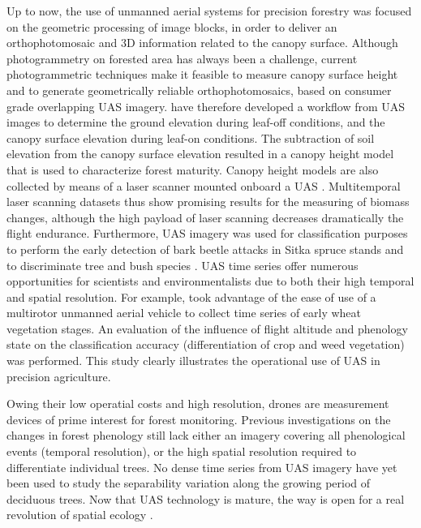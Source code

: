 \documentclass[remotesensing,article,submit,moreauthors,pdftex,12pt,a4paper]{mdpi} %
\begin{document}
Up to now, the use of unmanned aerial systems for precision forestry was focused on the geometric processing of image blocks, in order to deliver an orthophotomosaic and 3D information related to the canopy surface. 
Although photogrammetry on forested area has always been a challenge, current photogrammetric techniques make it feasible to measure canopy surface height and to generate geometrically reliable orthophotomosaics, based on consumer grade overlapping UAS imagery. 
\citeauthor{dandois_high_2013} \cite{dandois_high_2013} have therefore developed a workflow from UAS images to determine the ground elevation during leaf-off conditions, and the canopy surface elevation during leaf-on conditions. 
The subtraction of soil elevation from the canopy surface elevation resulted in a canopy height model that is used to characterize forest maturity. 
Canopy height models are also collected by means of a laser scanner mounted onboard a UAS \cite{jaakkola_low-cost_2010}. 
Multitemporal laser scanning datasets thus show promising results for the measuring of biomass changes, although the high payload of laser scanning decreases dramatically the flight endurance.
Furthermore, UAS imagery was used for classification purposes to perform the early detection of bark beetle attacks in Sitka spruce stands \cite{drauschke_towards_2014} and to discriminate tree and bush species \cite{gini_use_2014}. 
UAS time series offer numerous opportunities for scientists and environmentalists due to both their high temporal and spatial resolution. 
For example, \citeauthor{torres-sanchez_multitemporal_2014} \cite{torres-sanchez_multitemporal_2014} took advantage of the ease of use of a multirotor unmanned aerial vehicle to collect time series of early wheat vegetation stages. 
An evaluation of the influence of flight altitude and phenology state on the classification accuracy (differentiation of crop and weed vegetation) was performed. 
This study clearly illustrates the operational use of UAS in precision agriculture. 

Owing their low operatial costs and high resolution, drones are measurement devices of prime interest for forest monitoring.
Previous investigations on the changes in forest phenology still lack either an imagery covering all phenological events (temporal resolution), or the high spatial resolution required to differentiate individual trees.
No dense time series from UAS imagery have yet been used to study the separability variation along the growing period of deciduous trees.
Now that UAS technology is mature, the way is open for a real revolution of spatial ecology \cite{anderson_lightweight_2013}.
\end{document}
